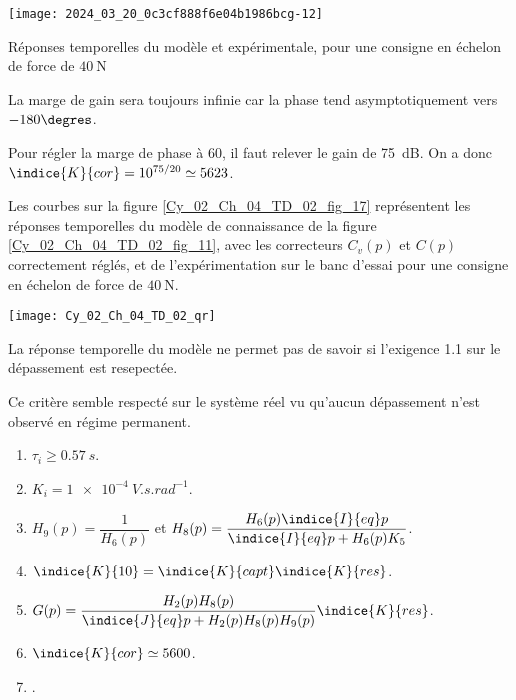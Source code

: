 \begin{marginfigure}%
\texttt{[image: 2024\_03\_20\_0c3cf888f6e04b1986bcg-12]}
\caption{Réponses temporelles du modèle et expérimentale, pour une consigne en échelon de force de $40 \mathrm{~N}$ \label{Cy_02_Ch_04_TD_02_fig_17}}
\end{marginfigure}
\fi

\ifprof
\begin{corrige}
La marge de gain sera toujours infinie car la phase tend asymptotiquement vers $-180\degres$.

Pour régler la marge de phase à 60\degres, il faut relever le gain de \SI{75}{dB}. On a donc $\indice{K}{cor}  =10^{75/20} \simeq  5623$.
\end{corrige}
\else
\fi



\ifprof
\else
Les courbes sur la figure \ref{Cy_02_Ch_04_TD_02_fig_17} représentent les réponses temporelles du modèle de connaissance de la figure \ref{Cy_02_Ch_04_TD_02_fig_11}, avec les correcteurs $C_{v}(p)$ et $C(p)$ correctement réglés, et de l'expérimentation sur le banc d'essai pour une consigne en échelon de force de $40 \mathrm{~N}$.
\fi


\ifprof
\else
\begin{marginfigure}
\centering
\texttt{[image: Cy\_02\_Ch\_04\_TD\_02\_qr]}
\end{marginfigure}
\fi


\ifprof
\begin{corrige}
La réponse temporelle du modèle ne permet pas de savoir si l'exigence 1.1 sur le dépassement est resepectée. 

Ce critère semble respecté sur le système réel vu qu'aucun dépassement n'est observé en régime permanent. 
\end{corrige}
\else
\fi
\ifprof
\else
\ifcolle
\else
\begin{solution}
\begin{enumerate}
\item $\tau_i \geq \SI{0,57}{s}$.
\item $K_i = \SI{1e-4}{V.s.rad^{-1}}$.
\item $H_9(p)=\dfrac{1}{H_6(p)}$ et $H_8(p)=\dfrac{H_6(p) \indice{I}{eq}p}{\indice{I}{eq}p+H_6(p) K_5 }$.
\item $\indice{K}{10} = \indice{K}{capt}\indice{K}{res}$.
\item $G(p) = \dfrac{H_2(p)H_8(p)}{\indice{J}{eq}p+H_2(p)H_8(p)H_9(p)}\indice{K}{res}$.
\item $\indice{K}{cor}\simeq 5600$.
\item .
\end{enumerate}
\end{solution}
\fi
\fi
